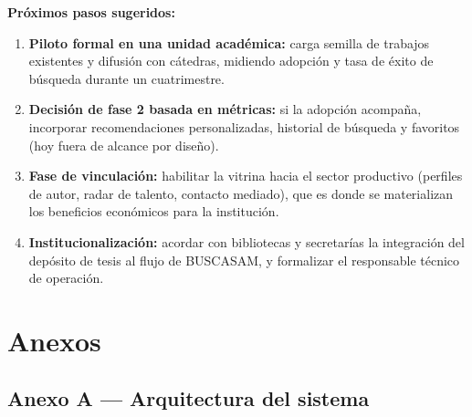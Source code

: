 \documentclass[12pt,a4paper]{article}
\begin{document}
\medskip
\noindent\textbf{Próximos pasos sugeridos:}
\begin{enumerate}
  \item \textbf{Piloto formal en una unidad académica:} carga semilla de trabajos existentes y difusión con cátedras, midiendo adopción y tasa de éxito de búsqueda durante un cuatrimestre.
  \item \textbf{Decisión de fase 2 basada en métricas:} si la adopción acompaña, incorporar recomendaciones personalizadas, historial de búsqueda y favoritos (hoy fuera de alcance por diseño).
  \item \textbf{Fase de vinculación:} habilitar la vitrina hacia el sector productivo (perfiles de autor, radar de talento, contacto mediado), que es donde se materializan los beneficios económicos para la institución.
  \item \textbf{Institucionalización:} acordar con bibliotecas y secretarías la integración del depósito de tesis al flujo de BUSCASAM, y formalizar el responsable técnico de operación.
\end{enumerate}

\clearpage
\section{Anexos}

\subsection*{Anexo A — Arquitectura del sistema}
\end{document}
